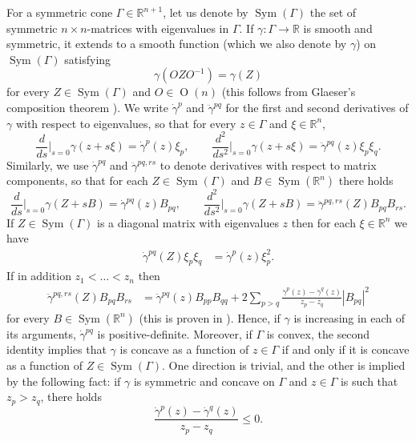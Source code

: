 \documentclass[12pt]{amsart}
\DeclareMathOperator{\sym}{Sym}
\DeclareMathOperator{\orthog}{O}
\begin{document}
For a symmetric cone $\Gamma \in \mathbb{R}^{n+1}$, let us denote by $\sym(\Gamma)$ the set of symmetric $n\times n$-matrices with eigenvalues in $\Gamma$. If $\gamma : \Gamma \to \mathbb{R}$ is smooth and symmetric, it extends to a smooth function (which we also denote by $\gamma$) on $\sym(\Gamma)$ satisfying
\[\gamma(O ZO^{-1}) = \gamma(Z)\]
for every $Z \in \sym(\Gamma)$ and $O \in \orthog(n)$ (this follows from Glaeser's composition theorem \cite{Glaeser}). We write $\dot \gamma^{p}$ and $\ddot \gamma^{pq}$ for the first and second derivatives of $\gamma$ with respect to eigenvalues, so that for every $z \in \Gamma$ and $\xi \in \mathbb{R}^n$,
\[\frac{d}{ds} \Big|_{s = 0 } \gamma(z + s\xi)= \dot \gamma^p(z)\xi_p , \qquad \frac{d^2}{ds^2} \Big|_{s = 0 } \gamma(z + s\xi)= \ddot \gamma^{pq}(z)\xi_p\xi_q .\]
Similarly, we use $\dot \gamma^{pq}$ and $\ddot \gamma^{pq,rs}$ to denote derivatives with respect to matrix components, so that for each $Z \in \sym(\Gamma)$ and $B \in \sym(\mathbb{R}^n)$ there holds 
\[\frac{d}{ds} \Big|_{s = 0 } \gamma(Z + sB) = \dot \gamma^{pq}(z) B_{pq}, \qquad \frac{d^2}{ds^2} \Big|_{s = 0 }\gamma(Z + sB) = \ddot \gamma^{pq,rs}(Z) B_{pq} B_{rs}.\]
If $Z \in \sym (\Gamma)$ is a diagonal matrix with eigenvalues $z$ then for each $\xi \in \mathbb{R}^n$ we have
\begin{align*}
\dot \gamma^{pq}(Z)\xi_p \xi_q &= \dot \gamma^{p} (z) \xi_p^2.
\end{align*}
If in addition $z_1 < \dots <z_n$ then
\begin{align*}
\ddot \gamma^{pq,rs}(Z) B_{pq} B_{rs} &= \ddot \gamma^{pq} (z) B_{pp} B_{qq} + 2 \sum_{p > q} \frac{\dot \gamma^{p} (z) - \dot \gamma^{q} (z)}{z_p - z_q} |B_{pq}|^2
\end{align*}
for every $B \in \sym(\mathbb{R}^n)$ (this is proven in \cite{And07}). Hence, if $\gamma$ is increasing in each of its arguments, $\dot \gamma^{pq}$ is positive-definite. Moreover, if $\Gamma$ is convex, the second identity implies that $\gamma$ is concave as a function of $z \in \Gamma$ if and only if it is concave as a function of $Z \in \sym(\Gamma)$. One direction is trivial, and the other is implied by the following fact: if $\gamma$ is symmetric and concave on $\Gamma$ and $z \in \Gamma$ is such that $z_p > z_q$, there holds
\begin{equation}
\label{eq:concave_firstderivs}
\frac{\dot \gamma^p(z) - \dot \gamma^q(z)}{z_p - z_q} \leq 0.
\end{equation}
\end{document}
